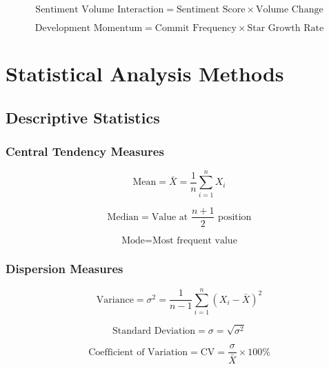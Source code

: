 \documentclass[12pt,a4paper]{article}
\begin{document}
\begin{equation}
\text{Sentiment Volume Interaction} = \text{Sentiment Score} \times \text{Volume Change}
\end{equation}

\begin{equation}
\text{Development Momentum} = \text{Commit Frequency} \times \text{Star Growth Rate}
\end{equation}

\section{Statistical Analysis Methods}

\subsection{Descriptive Statistics}

\subsubsection{Central Tendency Measures}

\begin{equation}
\text{Mean} = \bar{X} = \frac{1}{n} \sum_{i=1}^{n} X_i
\end{equation}

\begin{equation}
\text{Median} = \text{Value at } \frac{n+1}{2} \text{ position}
\end{equation}

\begin{equation}
\text{Mode} = \text{Most frequent value}
\end{equation}

\subsubsection{Dispersion Measures}

\begin{equation}
\text{Variance} = \sigma^2 = \frac{1}{n-1} \sum_{i=1}^{n} (X_i - \bar{X})^2
\end{equation}

\begin{equation}
\text{Standard Deviation} = \sigma = \sqrt{\sigma^2}
\end{equation}

\begin{equation}
\text{Coefficient of Variation} = \text{CV} = \frac{\sigma}{\bar{X}} \times 100\%
\end{equation}
\end{document}
